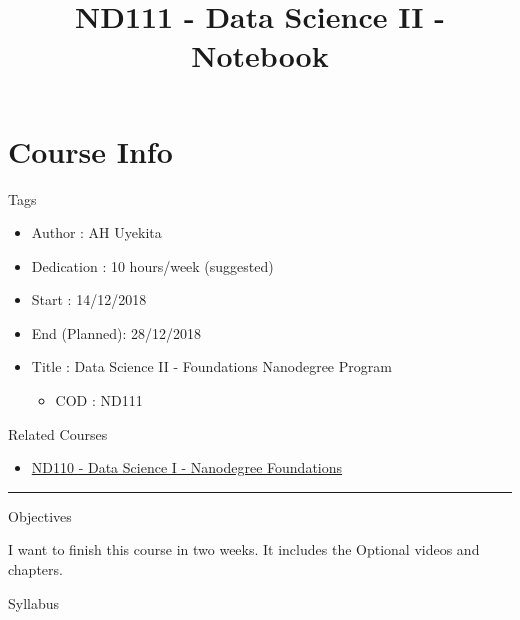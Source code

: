\documentclass[]{book}
\title{ND111 - Data Science II - Notebook}
\author{}
\date{}
\providecommand{\tightlist}{%
  \setlength{\itemsep}{0pt}\setlength{\parskip}{0pt}}
\begin{document}
\maketitle

{
\setcounter{tocdepth}{1}
\tableofcontents
}
\chapter*{Course Info}\label{course-info}

Tags

\begin{itemize}
\tightlist
\item
  Author : AH Uyekita
\item
  Dedication : 10 hours/week (suggested)
\item
  Start : 14/12/2018
\item
  End (Planned): 28/12/2018
\item
  Title : Data Science II - Foundations Nanodegree Program

  \begin{itemize}
  \tightlist
  \item
    COD : ND111
  \end{itemize}
\end{itemize}

Related Courses

\begin{itemize}
\tightlist
\item
  \href{https://br.udacity.com/course/python-fundamentos-data-science--nd110}{ND110
  - Data Science I - Nanodegree Foundations}
\end{itemize}

\begin{center}\rule{0.5\linewidth}{\linethickness}\end{center}

Objectives

I want to finish this course in two weeks. It includes the Optional
videos and chapters.

Syllabus
\end{document}
